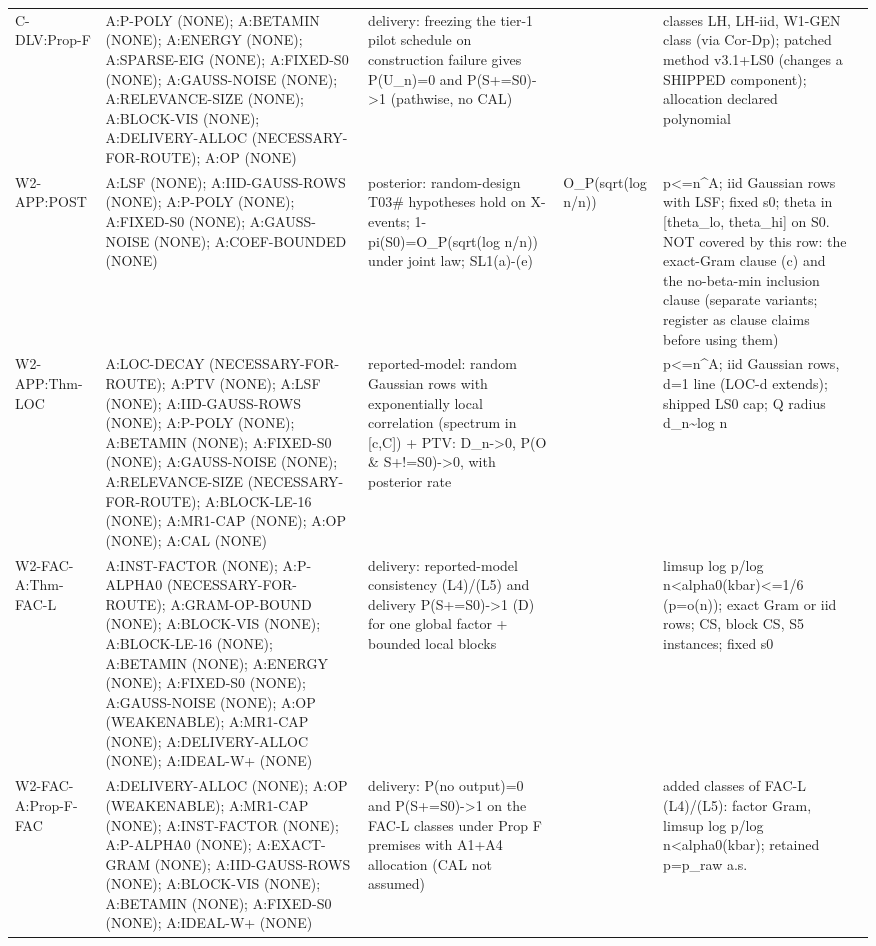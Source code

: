 \begin{longtable}{p{2.2cm}p{4.2cm}p{3cm}p{1.6cm}p{2.6cm}p{1.6cm}}
C-DLV:Prop-F & A:P-POLY (NONE); A:BETAMIN (NONE); A:ENERGY (NONE); A:SPARSE-EIG (NONE); A:FIXED-S0 (NONE); A:GAUSS-NOISE (NONE); A:RELEVANCE-SIZE (NONE); A:BLOCK-VIS (NONE); A:DELIVERY-ALLOC (NECESSARY-FOR-ROUTE); A:OP (NONE) & delivery: freezing the tier-1 pilot schedule on construction failure gives P(U\_n)=0 and P(S+=S0)->1 (pathwise, no CAL) &  & classes LH, LH-iid, W1-GEN class (via Cor-Dp); patched method v3.1+LS0 (changes a SHIPPED component); allocation declared polynomial &  \\
W2-APP:POST & A:LSF (NONE); A:IID-GAUSS-ROWS (NONE); A:P-POLY (NONE); A:FIXED-S0 (NONE); A:GAUSS-NOISE (NONE); A:COEF-BOUNDED (NONE) & posterior: random-design T03\# hypotheses hold on X-events; 1-pi(S0)=O\_P(sqrt(log n/n)) under joint law; SL1(a)-(e) & O\_P(sqrt(log n/n)) & p<=n\^{}A; iid Gaussian rows with LSF; fixed s0; theta in [theta\_lo, theta\_hi] on S0. NOT covered by this row: the exact-Gram clause (c) and the no-beta-min inclusion clause (separate variants; register as clause claims before using them) &  \\
W2-APP:Thm-LOC & A:LOC-DECAY (NECESSARY-FOR-ROUTE); A:PTV (NONE); A:LSF (NONE); A:IID-GAUSS-ROWS (NONE); A:P-POLY (NONE); A:BETAMIN (NONE); A:FIXED-S0 (NONE); A:GAUSS-NOISE (NONE); A:RELEVANCE-SIZE (NECESSARY-FOR-ROUTE); A:BLOCK-LE-16 (NONE); A:MR1-CAP (NONE); A:OP (NONE); A:CAL (NONE) & reported-model: random Gaussian rows with exponentially local correlation (spectrum in [c,C]) + PTV: D\_n->0, P(O \& S+!=S0)->0, with posterior rate &  & p<=n\^{}A; iid Gaussian rows, d=1 line (LOC-d extends); shipped LS0 cap; Q radius d\_n\~{}log n &  \\
W2-FAC-A:Thm-FAC-L & A:INST-FACTOR (NONE); A:P-ALPHA0 (NECESSARY-FOR-ROUTE); A:GRAM-OP-BOUND (NONE); A:BLOCK-VIS (NONE); A:BLOCK-LE-16 (NONE); A:BETAMIN (NONE); A:ENERGY (NONE); A:FIXED-S0 (NONE); A:GAUSS-NOISE (NONE); A:OP (WEAKENABLE); A:MR1-CAP (NONE); A:DELIVERY-ALLOC (NONE); A:IDEAL-W+ (NONE) & delivery: reported-model consistency (L4)/(L5) and delivery P(S+=S0)->1 (D) for one global factor + bounded local blocks &  & limsup log p/log n<alpha0(kbar)<=1/6 (p=o(n)); exact Gram or iid rows; CS, block CS, S5 instances; fixed s0 &  \\
W2-FAC-A:Prop-F-FAC & A:DELIVERY-ALLOC (NONE); A:OP (WEAKENABLE); A:MR1-CAP (NONE); A:INST-FACTOR (NONE); A:P-ALPHA0 (NONE); A:EXACT-GRAM (NONE); A:IID-GAUSS-ROWS (NONE); A:BLOCK-VIS (NONE); A:BETAMIN (NONE); A:FIXED-S0 (NONE); A:IDEAL-W+ (NONE) & delivery: P(no output)=0 and P(S+=S0)->1 on the FAC-L classes under Prop F premises with A1+A4 allocation (CAL not assumed) &  & added classes of FAC-L (L4)/(L5): factor Gram, limsup log p/log n<alpha0(kbar); retained p=p\_raw a.s. &  \\

\end{longtable}
